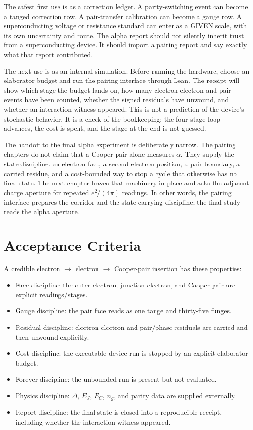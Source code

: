 The safest first use is as a correction ledger. A parity-switching event can become a tanged correction row. A
pair-transfer calibration can become a gauge row. A superconducting voltage or resistance standard can enter as
a GIVEN scale, with its own uncertainty and route. The alpha report should not silently inherit trust from a
superconducting device. It should import a pairing report and say exactly what that report contributed.

The next use is as an internal simulation. Before running the hardware, choose an elaborator budget and run the
pairing interface through Lean. The receipt will show which stage the budget lands on, how many electron-electron
and pair events have been counted, whether the signed residuals have unwound, and whether an interaction witness
appeared. This is not a prediction of the device's stochastic behavior. It is a check of the bookkeeping: the
four-stage loop advances, the cost is spent, and the stage at the end is not guessed.

The handoff to the final alpha experiment is deliberately narrow. The pairing chapters do not claim that a
Cooper pair alone measures \(\alpha\). They supply the state discipline: an electron fact, a second electron
position, a pair boundary, a carried residue, and a cost-bounded way to stop a cycle that otherwise has no final
state. The next chapter leaves that machinery in place and asks the adjacent charge aperture for repeated
\(e^2/(4\pi)\) readings. In other words, the pairing interface prepares the corridor and the state-carrying
discipline; the final study reads the alpha aperture.

\section{Acceptance Criteria}

A credible electron \(\to\) electron \(\to\) Cooper-pair insertion has these properties:

\begin{itemize}
\item Face discipline: the outer electron, junction electron, and Cooper pair are explicit readings/stages.
\item Gauge discipline: the pair face reads as one tange and thirty-five funges.
\item Residual discipline: electron-electron and pair/phase residuals are carried and then unwound explicitly.
\item Cost discipline: the executable device run is stopped by an explicit elaborator budget.
\item Forever discipline: the unbounded run is present but not evaluated.
\item Physics discipline: \(\Delta\), \(E_J\), \(E_C\), \(n_g\), and parity data are supplied externally.
\item Report discipline: the final state is closed into a reproducible receipt, including whether the interaction
witness appeared.
\end{itemize}


